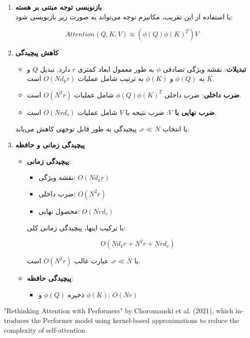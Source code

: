 \begin{qsolve}
	\begin{enumerate}
		
		
			\item \textbf{بازنویسی توجه مبتنی بر هسته}\\
			با استفاده از این تقریب، مکانیزم توجه می‌تواند به صورت زیر بازنویسی شود:
			
			\[ Attention(Q, K, V) \approx \left(\phi(Q) \phi(K)^T \right) V \]
		
		
		
		
			\item \textbf{کاهش پیچیدگی}\\
			\begin{itemize}
					\item \textbf{تبدیلات}: نقشه ویژگی تصادفی \( \phi \) به طور معمول ابعاد کمتری \( r \) دارد. تبدیل \( Q \) و \( K \) به \( \phi(Q) \) و \( \phi(K) \) به ترتیب شامل عملیات \( O(Nd_kr) \) است.
					\item \textbf{ضرب داخلی}: ضرب داخلی \( \phi(Q) \phi(K)^T \) شامل عملیات \( O(N^2 r) \) است.
					\item \textbf{ضرب نهایی با \( V \)}: ضرب نتیجه با \( V \) شامل عملیات \( O(Nrd_v) \) است.
				\end{itemize}
			با انتخاب \( r \ll N \)، پیچیدگی به طور قابل توجهی کاهش می‌یابد.
		
		
		
		
		
		
		\item \textbf{پیچیدگی زمانی و حافظه}\\
		\begin{itemize}
			\item \textbf{پیچیدگی زمانی}:
			\begin{itemize}
				\item نقشه ویژگی: \( O(Nd_kr) \)
				\item ضرب داخلی: \( O(N^2r) \)
				\item محصول نهایی: \( O(Nrd_v) \)
			\end{itemize}
			
			با ترکیب اینها، پیچیدگی زمانی کلی:
			
			\[ O(Nd_kr + N^2r + Nrd_v) \]
			
			با \( r \ll N \)، عبارت غالب \( O(N^2r) \) است.
			
			\item \textbf{پیچیدگی حافظه}:
			\begin{itemize}
				\item ذخیره \( \phi(Q) \) و \( \phi(K) \): \( O(Nr) \)
			\end{itemize}
		\end{itemize}
		
		
		
	\end{enumerate}
\end{qsolve}


\begin{latin}
	\begin{thebibliography}{9}
		"Rethinking Attention with Performers" by Choromanski et al. (2021), which introduces the Performer model using kernel-based approximations to reduce the complexity of self-attention.
	\end{thebibliography} 
\end{latin}
